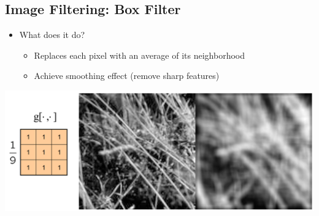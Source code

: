 \documentclass[10pt]{article}
\begin{document}
\subsection*{Image Filtering: Box Filter}
\begin{itemize}
	\item What does it do?
	\begin{itemize}
        \item Replaces each pixel with an average of its neighborhood
        \item Achieve smoothing effect (remove sharp features)
    \end{itemize}
\end{itemize}
\begin{center} 
	\includegraphics*[width=\textwidth]{L2_10.png} 
\end{center}
\end{document}
